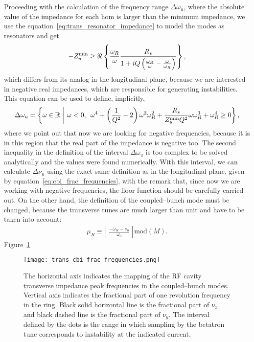     Proceeding with the calculation of the frequency range $\Delta\omega_u$, where the absolute value of the impedance for each \gls{hom} is larger than the minimum impedance, we use the equation~\eqref{eq:trans_resonator_impedance} to model the modes as resonators and get
    \begin{align}
        -Z_u^\text{min} \ge \Re\left\{\frac{\omega_R}{\omega}\frac{R_s}{1 + iQ\left(\frac{\omega_R}{\omega}-\frac{\omega}{\omega_R}\right)}\right\},
    \end{align}
    which differs from its analog in the longitudinal plane, because we are interested in negative real impedances, which are responsible for generating instabilities. This equation can be used to define, implicitly,
    \begin{align}
        \Delta\omega_u = \left\{\omega \in \mathbb{R\,\,} \middle|\,\,
        \omega < 0,\,\,\, \omega^4 + \left(\frac{1}{Q^2}-2\right)\omega^2\omega_R^2 + \frac{R_s}{Z_u^\text{min}Q^2}\omega\omega_R^3 + \omega_R^4 \ge 0 \right\},
    \end{align}
    where we point out that now we are looking for negative frequencies, because it is in this region that the real part of the impedance is negative too. The second inequality in the definition of the interval $\Delta\omega_u$ is too complex to be solved analytically and the values were found numerically. With this interval, we can calculate $\Delta\nu_u$ using the exact same definition as in the longitudinal plane, given by equation~\eqref{eq:cbi_frac_frequencies}, with the remark that, since now we are working with negative frequencies, the floor function should be carefully carried out. On the other hand, the definition of the coupled--bunch mode must be changed, because the transverse tunes are much larger than unit and have to be taken into account:
    \begin{align}
        \mu_R \equiv \left\lfloor\frac{-\omega_R-\nu_u}{\omega_0}\right\rfloor \text{mod}(M).
    \end{align}
    Figure~\ref{fig:trans_cbi_frac_frequencies}
    \begin{figure}
        \centering
        \texttt{[image: trans\_cbi\_frac\_frequencies.png]}
        \caption{The horizontal axis indicates the mapping of the RF cavity transverse impedance peak frequencies in the coupled--bunch modes. Vertical axis indicates the fractional part of one revolution frequency in the ring. Black solid horizontal line is the fractional part of $\nu_x$ and black dashed line is the fractional part of $\nu_y$. The interval defined by the dots is the range in which sampling by the betatron tune corresponds to instability at the indicated current.}
        \label{fig:trans_cbi_frac_frequencies}
    \end{figure}
